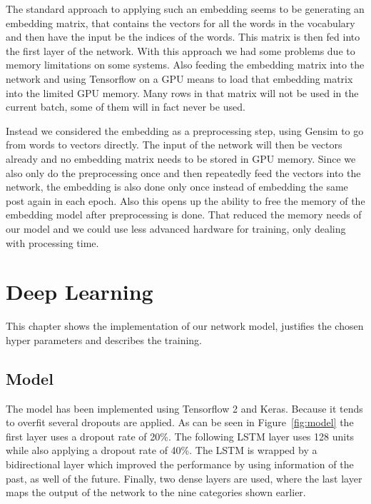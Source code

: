 \documentclass[11pt,a4paper]{article}
\begin{document}
The standard approach to applying such an embedding seems to be generating an embedding matrix, that contains the vectors for all the words in the vocabulary and then have the input be the indices of the words. 
This matrix is then fed into the first layer of the network. With this approach we had some problems due to memory limitations on some systems. 
Also feeding the embedding matrix into the network and using Tensorflow on a GPU means to load that embedding matrix into the limited GPU memory. 
Many rows in that matrix will not be used in the current batch, some of them will in fact never be used.

Instead we considered the embedding as a preprocessing step, using Gensim to go from words to vectors directly.
The input of the network will then be vectors already and no embedding matrix needs to be stored in GPU memory.
Since we also only do the preprocessing once and then repeatedly feed the vectors into the network, the embedding is also done only once instead of embedding the same post again in each epoch.
Also this opens up the ability to free the memory of the embedding model after preprocessing is done.
That reduced the memory needs of our model and we could use less advanced hardware for training, only dealing with processing time.


\section{Deep Learning}

This chapter shows the implementation of our network model, justifies the chosen hyper parameters and describes the training.


\subsection{Model}
The model has been implemented using Tensorflow 2 and Keras. Because it tends to overfit several dropouts are applied. As can be seen in Figure~\ref{fig:model} the first layer uses a dropout rate of 20\%. The following LSTM layer uses 128 units while also applying a dropout rate of 40\%. The LSTM is wrapped by a bidirectional layer which improved the performance by using information of the past, as well of the future. Finally, two dense layers are used, where the last layer maps the output of the network to the nine categories shown earlier.
\end{document}
